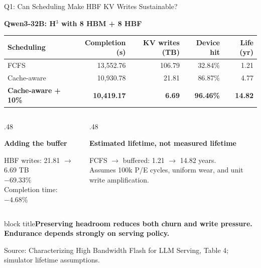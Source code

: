 \documentclass[aspectratio=169,10pt]{beamer}
\newcommand{\takeaway}[1]{\par\vspace{.12cm}\begin{beamercolorbox}[rounded=true,sep=.12cm,wd=\linewidth]{block title}\small\bfseries #1\end{beamercolorbox}}
\newcommand{\src}[1]{\par\vfill{\fontsize{7}{8}\selectfont\color{Muted}Source: Characterizing High Bandwidth Flash for LLM Serving, #1.}\par}
\newcommand{\head}[1]{\par{\color{Accent}\bfseries #1}\par\smallskip}
\begin{document}
\begin{frame}[t]{Q1: Can Scheduling Make HBF KV Writes Sustainable?}

\head{Qwen3-32B: H$^3$ with 8 HBM + 8 HBF}
\begin{tabularx}{\textwidth}{@{}Xrrrr@{}}\toprule
Scheduling & Completion (s)& KV writes (TB)& Device hit& Life (yr)\\\midrule
FCFS &13,552.76&106.79&32.84\%&1.21\\
Cache-aware &10,930.78&21.81&86.87\%&4.77\\
\textbf{Cache-aware + 10\%}&\textbf{10,419.17}&\textbf{6.69}&\textbf{96.46\%}&\textbf{14.82}\\\bottomrule
\end{tabularx}
\vspace{.3cm}
\begin{columns}[T,onlytextwidth]
\begin{column}{.48\textwidth}
\head{Adding the buffer}
HBF writes: 21.81 $\rightarrow$ 6.69 TB\\
{\Large\color{Accent}$-69.33\%$}\\[.12cm]
Completion time: \textbf{$-4.68\%$}
\end{column}
\begin{column}{.48\textwidth}
\head{Estimated lifetime, not measured lifetime}
FCFS $\rightarrow$ buffered: 1.21 $\rightarrow$ 14.82 years.\\[.12cm]
Assumes 100k P/E cycles, uniform wear, and unit write amplification.
\end{column}
\end{columns}
\takeaway{Preserving headroom reduces both churn and write pressure. Endurance depends strongly on serving policy.}

\src{Table 4; simulator lifetime assumptions}
\end{frame}
\end{document}
